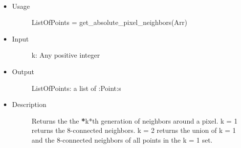 \documentclass[letterpaper,10pt,oneside]{sphinxmanual}
\begin{document}
\begin{fulllineitems}
\label{index:libcelegans.get_absolute_pixel_neighbors}~\begin{itemize}
\item {} \begin{description}
\item[{Usage}] \leavevmode
ListOfPoints = get\_absolute\_pixel\_neighbors(Arr)

\end{description}

\item {} \begin{description}
\item[{Input}] \leavevmode
k: Any positive integer

\end{description}

\item {} \begin{description}
\item[{Output}] \leavevmode
ListOfPoints:  a list of :Point:s

\end{description}

\item {} \begin{description}
\item[{Description}] \leavevmode
Returns the the {\color{red}\bfseries{}*}k*th generation of neighbors around a pixel. k = 1 
returns the 8-connected neighbors.  k = 2 returns the union of k = 1
and the 8-connected neighbors of all points in the k = 1 set.

\end{description}

\end{itemize}

\end{fulllineitems}

\end{document}
